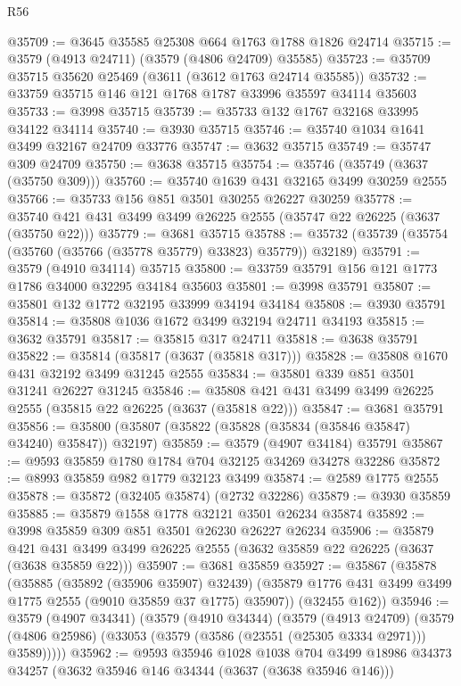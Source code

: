 \begin{lexlean}{R56}
\begin{coremodule}
@35709 := @3645 @35585 @25308 @664 @1763 @1788 @1826 @24714
@35715 := @3579 (@4913 @24711) (@3579 (@4806 @24709) @35585)
@35723 := @35709 @35715 @35620 @25469 (@3611 (@3612 @1763 @24714 @35585))
@35732 := @33759 @35715 @146 @121 @1768 @1787 @33996 @35597 @34114 @35603
@35733 := @3998 @35715
@35739 := @35733 @132 @1767 @32168 @33995 @34122 @34114
@35740 := @3930 @35715
@35746 := @35740 @1034 @1641 @3499 @32167 @24709 @33776
@35747 := @3632 @35715
@35749 := @35747 @309 @24709
@35750 := @3638 @35715
@35754 := @35746 (@35749 (@3637 (@35750 @309)))
@35760 := @35740 @1639 @431 @32165 @3499 @30259 @2555
@35766 := @35733 @156 @851 @3501 @30255 @26227 @30259
@35778 := @35740 @421 @431 @3499 @3499 @26225 @2555 (@35747 @22 @26225 (@3637 (@35750 @22)))
@35779 := @3681 @35715
@35788 := @35732 (@35739 (@35754 (@35760 (@35766 (@35778 @35779) @33823) @35779)) @32189)
@35791 := @3579 (@4910 @34114) @35715
@35800 := @33759 @35791 @156 @121 @1773 @1786 @34000 @32295 @34184 @35603
@35801 := @3998 @35791
@35807 := @35801 @132 @1772 @32195 @33999 @34194 @34184
@35808 := @3930 @35791
@35814 := @35808 @1036 @1672 @3499 @32194 @24711 @34193
@35815 := @3632 @35791
@35817 := @35815 @317 @24711
@35818 := @3638 @35791
@35822 := @35814 (@35817 (@3637 (@35818 @317)))
@35828 := @35808 @1670 @431 @32192 @3499 @31245 @2555
@35834 := @35801 @339 @851 @3501 @31241 @26227 @31245
@35846 := @35808 @421 @431 @3499 @3499 @26225 @2555 (@35815 @22 @26225 (@3637 (@35818 @22)))
@35847 := @3681 @35791
@35856 := @35800 (@35807 (@35822 (@35828 (@35834 (@35846 @35847) @34240) @35847)) @32197)
@35859 := @3579 (@4907 @34184) @35791
@35867 := @9593 @35859 @1780 @1784 @704 @32125 @34269 @34278 @32286
@35872 := @8993 @35859 @982 @1779 @32123 @3499
@35874 := @2589 @1775 @2555
@35878 := @35872 (@32405 @35874) (@2732 @32286)
@35879 := @3930 @35859
@35885 := @35879 @1558 @1778 @32121 @3501 @26234 @35874
@35892 := @3998 @35859 @309 @851 @3501 @26230 @26227 @26234
@35906 := @35879
    @421
    @431
    @3499
    @3499
    @26225
    @2555
    (@3632 @35859 @22 @26225 (@3637 (@3638 @35859 @22)))
@35907 := @3681 @35859
@35927 := @35867
    (@35878
      (@35885
        (@35892 (@35906 @35907) @32439)
        (@35879 @1776 @431 @3499 @3499 @1775 @2555 (@9010 @35859 @37 @1775) @35907))
      (@32455 @162))
@35946 := @3579
    (@4907 @34341)
    (@3579
      (@4910 @34344)
      (@3579
        (@4913 @24709)
        (@3579 (@4806 @25986) (@33053 (@3579 (@3586 (@23551 (@25305 @3334 @2971))) @3589)))))
@35962 := @9593
    @35946
    @1028
    @1038
    @704
    @3499
    @18986
    @34373
    @34257
    (@3632 @35946 @146 @34344 (@3637 (@3638 @35946 @146)))

\end{coremodule}
\end{lexlean}

